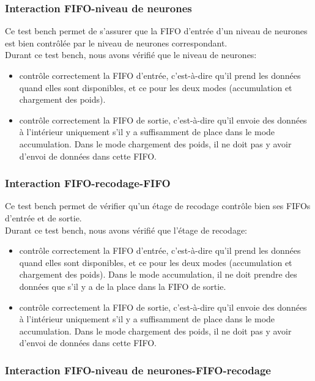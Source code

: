 \subsubsection{Interaction FIFO-niveau de neurones}

Ce test bench permet de s'assurer que la FIFO d'entrée d'un niveau de neurones
est bien contrôlée par le niveau de neurones correspondant.\\

Durant ce test bench, nous avons vérifié que le niveau de neurones:
\begin{itemize}
	\item contrôle correctement la FIFO d'entrée, c'est-à-dire qu'il prend
	les données quand elles sont disponibles, et ce pour les deux modes
	(accumulation et chargement des poids).
	\item contrôle correctement la FIFO de sortie, c'est-à-dire qu'il envoie
	des données à l'intérieur uniquement s'il y a suffisamment de place dans
	le mode accumulation. Dans le mode chargement des poids, il ne doit pas
	y avoir d'envoi de données dans cette FIFO.
\end{itemize}

\subsubsection{Interaction FIFO-recodage-FIFO}

Ce test bench permet de vérifier qu'un étage de recodage contrôle bien ses FIFOs
d'entrée et de sortie.\\

Durant ce test bench, nous avons vérifié que l'étage de recodage:
\begin{itemize}
	\item contrôle correctement la FIFO d'entrée, c'est-à-dire qu'il prend
	les données quand elles sont disponibles, et ce pour les deux modes
	(accumulation et chargement des poids). Dans le mode accumulation, il
	ne doit prendre des données que s'il y a de la place dans la FIFO de
	sortie.
	\item contrôle correctement la FIFO de sortie, c'est-à-dire qu'il envoie
	des données à l'intérieur uniquement s'il y a suffisamment de place dans
	le mode accumulation. Dans le mode chargement des poids, il ne doit pas
	y avoir d'envoi de données dans cette FIFO.
\end{itemize}

\subsubsection{Interaction FIFO-niveau de neurones-FIFO-recodage}

